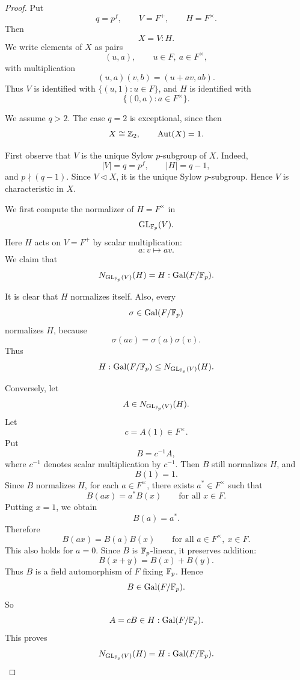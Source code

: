 \begin{proof}
    Put
    \[
        q=p^f,\qquad V=F^+,\qquad H=F^\times.
    \]
    Then
    \[
        X=V:H.
    \]
    We write elements of \(X\) as pairs
    \[
        (u,a),
        \qquad
        u\in F,\ a\in F^\times,
    \]
    with multiplication
    \[
        (u,a)(v,b)=(u+av,ab).
    \]
    Thus \(V\) is identified with \(\{(u,1):u\in F\}\), and \(H\) is identified with
    \[
        \{(0,a):a\in F^\times\}.
    \]
    
    We assume \(q>2\). The case \(q=2\) is exceptional, since then
    \[
        X\cong \mathbb{Z}_2,
        \qquad
        \operatorname{Aut}(X)=1.
    \]
    
    First observe that \(V\) is the unique Sylow \(p\)-subgroup of \(X\). Indeed,
    \[
        |V|=q=p^f,
        \qquad
        |H|=q-1,
    \]
    and \(p\nmid(q-1)\). Since \(V\lhd X\), it is the unique Sylow \(p\)-subgroup. Hence \(V\) is characteristic in \(X\).
    
    We first compute the normalizer of \(H=F^\times\) in
    \[
        \operatorname{GL}_{\mathbb{F}_p}(V).
    \]
    Here \(H\) acts on \(V=F^+\) by scalar multiplication:
    \[
        a:v\longmapsto av.
    \]
    We claim that
    \[
        N_{\operatorname{GL}_{\mathbb{F}_p}(V)}(H)
        =
        H:\operatorname{Gal}(F/\mathbb{F}_p).
    \]
    
    It is clear that \(H\) normalizes itself. Also, every
    \[
        \sigma\in \operatorname{Gal}(F/\mathbb{F}_p)
    \]
    normalizes \(H\), because
    \[
        \sigma(av)=\sigma(a)\sigma(v).
    \]
    Thus
    \[
        H:\operatorname{Gal}(F/\mathbb{F}_p)
        \leq
        N_{\operatorname{GL}_{\mathbb{F}_p}(V)}(H).
    \]
    
    Conversely, let
    \[
        A\in N_{\operatorname{GL}_{\mathbb{F}_p}(V)}(H).
    \]
    Let
    \[
        c=A(1)\in F^\times.
    \]
    Put
    \[
        B=c^{-1}A,
    \]
    where \(c^{-1}\) denotes scalar multiplication by \(c^{-1}\). Then \(B\) still normalizes \(H\), and
    \[
        B(1)=1.
    \]
    Since \(B\) normalizes \(H\), for each \(a\in F^\times\), there exists \(a^*\in F^\times\) such that
    \[
        B(ax)=a^*B(x)
        \qquad
        \text{for all }x\in F.
    \]
    Putting \(x=1\), we obtain
    \[
        B(a)=a^*.
    \]
    Therefore
    \[
        B(ax)=B(a)B(x)
        \qquad
        \text{for all }a\in F^\times,\ x\in F.
    \]
    This also holds for \(a=0\). Since \(B\) is \(\mathbb{F}_p\)-linear, it preserves addition:
    \[
        B(x+y)=B(x)+B(y).
    \]
    Thus \(B\) is a field automorphism of \(F\) fixing \(\mathbb{F}_p\). Hence
    \[
        B\in \operatorname{Gal}(F/\mathbb{F}_p).
    \]
    So
    \[
        A=cB\in H:\operatorname{Gal}(F/\mathbb{F}_p).
    \]
    This proves
    \[
        N_{\operatorname{GL}_{\mathbb{F}_p}(V)}(H)
        =
        H:\operatorname{Gal}(F/\mathbb{F}_p).
    \]
    

\end{proof}
